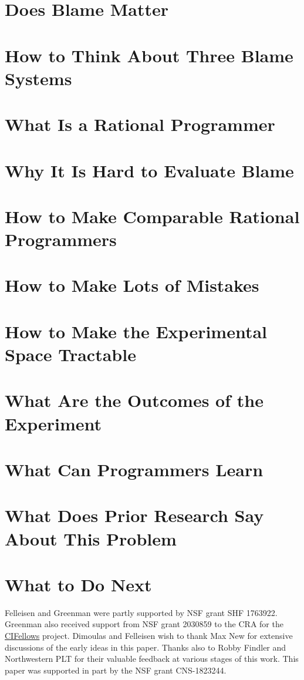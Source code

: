 \documentclass[acmsmall,screen]{acmart}
\begin{document}


\maketitle

\def\sec#1#2{\section{#2} \label{sec:#1} }

\sec{introduction}{Does Blame Matter}

\sec{landscape}   {How to Think About Three Blame Systems}
\sec{why-rational}{What Is a Rational Programmer}
\sec{challenges}  {Why It Is Hard to Evaluate Blame}
\sec{rational}    {How to Make Comparable Rational Programmers}
\sec{mutate}      {How to Make Lots of Mistakes}
\sec{sample}      {How to Make the Experimental Space Tractable}
\sec{results}     {What Are the Outcomes of the Experiment}
\sec{discussion}  {What Can Programmers Learn}
\sec{related}     {What Does Prior Research Say About This Problem}
\sec{conclusion}  {What to Do Next}

\begin{acks}                 
Felleisen and Greenman were partly supported by NSF grant SHF
1763922.
Greenman also received support from NSF grant 2030859 to the CRA for the
\href{https://cifellows2020.org}{CIFellows} project.
Dimoulas and Felleisen wish to thank Max New for
extensive discussions of the early ideas in this paper. Thanks also to
Robby Findler and Northwestern PLT for their valuable feedback at
various stages of this work.
This paper was supported in part by the NSF grant CNS-1823244.
\end{acks}



\end{document}
